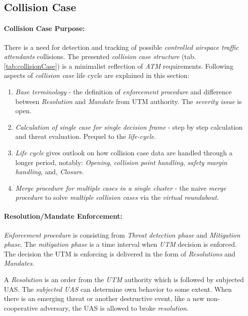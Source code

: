 \subsection{Collision Case}\label{sec:collisionCase}


\paragraph{Collision Case Purpose:} There is a need for detection and tracking of possible \emph{controlled airspace traffic attendants} collisions.  The presented \emph{collision case structure} (tab. \ref{tab:collisionCase}) is a minimalist reflection of \emph{ATM} requirements. Following aspects of  \emph{collision case} life cycle are explained in this section:
\begin{enumerate}
    \item \emph{Base terminology} - the definition of \emph{enforcement procedure} and difference between \emph{Resolution} and \emph{Mandate} from UTM authority. The \emph{severity issue} is open.
    
    \item \emph{Calculation of single case for single decision frame} - step by step calculation and threat evaluation. Prequel to the \emph{life-cycle}.
    
    \item \emph{Life cycle} gives outlook on how collision case data are handled through a longer period, notably: \emph{Opening}, \emph{collision point handling}, \emph{safety margin handling}, and, \emph{Closure}.
    
    \item \emph{Merge procedure for multiple cases in a single cluster} - the naive \emph{merge procedure} to solve \emph{multiple collision cases} via the \emph{virtual roundabout}.
\end{enumerate}


\paragraph{Resolution/Mandate Enforcement:}
\emph{Enforcement procedure} is consisting from \emph{Threat detection phase} and \emph{Mitigation phase}. The \emph{mitigation phase} is a time interval when \emph{UTM} decision is enforced. The decision the UTM is enforcing is delivered in the form of \emph{Resolutions} and \emph{Mandates}.


A \emph{Resolution} is an order from the \emph{UTM} authority which is followed by subjected UAS. The \emph{subjected UAS} can determine own behavior to some extent. When there is an emerging threat or another destructive event, like a new non-cooperative adversary, the UAS is allowed to broke \emph{resolution}.  

